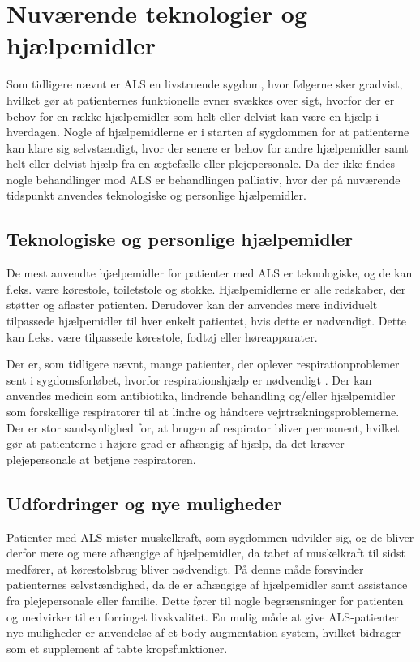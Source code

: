 \section{Nuværende teknologier og hjælpemidler}
Som tidligere nævnt er ALS en livstruende sygdom, hvor følgerne sker gradvist, hvilket gør at patienternes funktionelle evner svækkes over sigt, hvorfor der er behov for en række hjælpemidler som helt eller delvist kan være en hjælp i hverdagen. Nogle af hjælpemidlerne er i starten af sygdommen for at patienterne kan klare sig selvstændigt, hvor der senere er behov for andre hjælpemidler samt helt eller delvist hjælp fra en ægtefælle eller plejepersonale. Da der ikke findes nogle behandlinger mod ALS er behandlingen palliativ, hvor der på nuværende tidspunkt anvendes teknologiske og personlige hjælpemidler. \citep{brandt2010}

\subsection{Teknologiske og personlige hjælpemidler}
De mest anvendte hjælpemidler for patienter med ALS er teknologiske, og de kan f.eks. være kørestole, toiletstole og stokke. Hjælpemidlerne er alle redskaber, der støtter og aflaster patienten. Derudover kan der anvendes mere individuelt tilpassede hjælpemidler til hver enkelt patientet, hvis dette er nødvendigt. Dette kan f.eks. være tilpassede kørestole, fodtøj eller høreapparater. \citep{brandt2010}

Der er, som tidligere nævnt, mange patienter, der oplever respirationproblemer sent i sygdomsforløbet, hvorfor respirationshjælp er nødvendigt \citep{hefferman2006}. Der kan anvendes medicin som antibiotika, lindrende behandling og/eller hjælpemidler som forskellige respiratorer til at lindre og håndtere vejrtrækningsproblemerne. Der er stor sandsynlighed for, at brugen af respirator bliver permanent, hvilket gør at patienterne i højere grad er afhængig af hjælp, da det kræver plejepersonale at betjene respiratoren. \citep{rcfm2001}

\subsection{Udfordringer og nye muligheder}
Patienter med ALS mister muskelkraft, som sygdommen udvikler sig, og de bliver derfor mere og mere afhængige af hjælpemidler, da tabet af muskelkraft til sidst medfører, at kørestolsbrug bliver nødvendigt. På denne måde forsvinder patienternes selvstændighed, da de er afhængige af hjælpemidler samt assistance fra plejepersonale eller familie. \citep{brandt2010} Dette fører til nogle begrænsninger for patienten og medvirker til en forringet livskvalitet. En mulig måde at give ALS-patienter nye muligheder er anvendelse af et body augmentation-system, hvilket bidrager som et supplement af tabte kropsfunktioner. \citep{erlen2003} 

